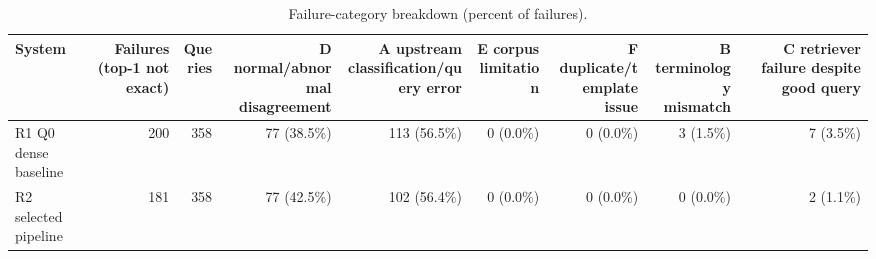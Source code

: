 \begin{table}[t]
\centering
\scriptsize
\begin{tabular}{lrrrrrrrr}
\hline
System & Failures (top-1 not exact) & Queries & D normal/abnormal disagreement & A upstream classification/query error & E corpus limitation & F duplicate/template issue & B terminology mismatch & C retriever failure despite good query \\
\hline
R1 Q0 dense baseline & 200 & 358 & 77 (38.5\%) & 113 (56.5\%) & 0 (0.0\%) & 0 (0.0\%) & 3 (1.5\%) & 7 (3.5\%) \\
R2 selected pipeline & 181 & 358 & 77 (42.5\%) & 102 (56.4\%) & 0 (0.0\%) & 0 (0.0\%) & 0 (0.0\%) & 2 (1.1\%) \\
\hline
\end{tabular}
\caption{Failure-category breakdown (percent of failures).}
\label{tab:table6_primary_failure_analysis}
\end{table}
